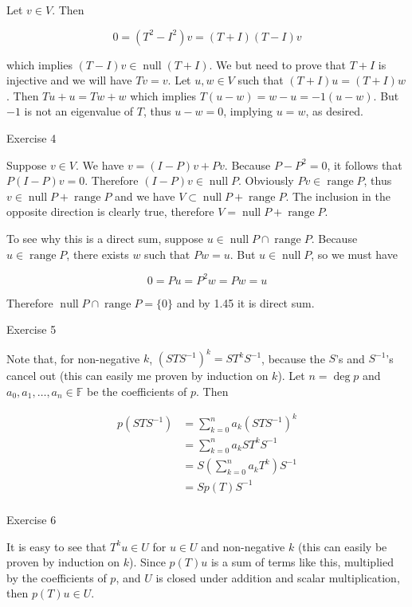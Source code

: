 \documentclass{article}
\begin{document}
Let $v \in V$. Then

$$ 0 = (T^2 - I^2)v = (T + I)(T - I)v $$

which implies $(T - I)v \in \operatorname{null} (T + I)$. We but need to prove that $T + I$ is injective and we will have $Tv = v$. Let $u, w \in V$ such that $(T + I)u = (T + I)w$. Then $Tu + u = Tw + w$ which implies $T(u - w) = w - u = -1(u - w)$. But $-1$ is not an eigenvalue of $T$, thus $u - w = 0$, implying $u = w$, as desired.

Exercise 4

Suppose $v \in V$. We have $v = (I - P)v + Pv$. Because $P - P^2 = 0$, it follows that $P(I - P)v = 0$. Therefore $(I - P)v \in \operatorname{null} P$. Obviously $Pv \in \operatorname{range} P$, thus $v \in \operatorname{null} P + \operatorname{range} P$ and we have $V \subset \operatorname{null} P + \operatorname{range} P$. The inclusion in the opposite direction is clearly true, therefore $V = \operatorname{null} P + \operatorname{range} P$.

To see why this is a direct sum, suppose $u \in \operatorname{null} P \cap \operatorname{range} P$. Because $u \in \operatorname{range} P$, there exists $w$ such that $Pw = u$. But $u \in \operatorname{null} P$, so we must have

$$ 0 = Pu = P^2 w = Pw = u $$

Therefore $\operatorname{null} P \cap \operatorname{range} P = \{0\}$ and by 1.45 it is direct sum.

Exercise 5

Note that, for non-negative $k$, $(STS^{-1})^k = ST^kS^{-1}$, because the $S$'s and $S^{-1}$'s cancel out (this can easily me proven by induction on $k$). Let $n = \deg p$ and $a_0, a_1, \dots, a_n \in \mathbb{F}$ be the coefficients of $p$. Then

$$ \begin{aligned} p(STS^{-1}) &= \sum\limits_{k=0}^n a_k(STS^{-1})^k\\ &= \sum\limits_{k=0}^n a_k S T^k S^{-1}\\ &= S(\sum\limits_{k=0}^n a_k T^k)S^{-1}\\ &= Sp(T)S^{-1}\\ \end{aligned} $$

Exercise 6

It is easy to see that $T^k u \in U$ for $u \in U$ and non-negative $k$ (this can easily be proven by induction on $k$). Since $p(T)u$ is a sum of terms like this, multiplied by the coefficients of $p$, and $U$ is closed under addition and scalar multiplication, then $p(T)u \in U$.
\end{document}
